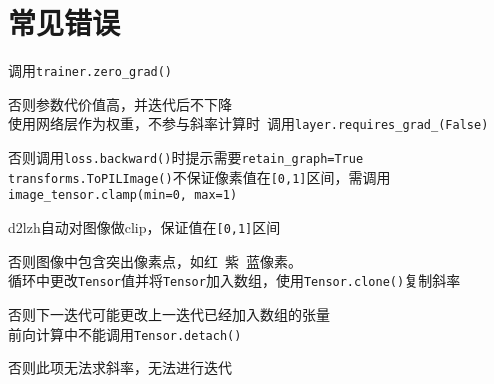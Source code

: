 \documentclass[UTF8]{ctexart}
\begin{document}
\section{常见错误}
\noindent 调用\texttt{trainer.zero\_grad()}

  否则参数代价值高，并迭代后不下降\\
使用网络层作为权重，不参与斜率计算时\ 调用\texttt{layer.requires\_grad\_(False)}

  否则调用\texttt{loss.backward()}时提示需要\texttt{retain\_graph=True}\\
\texttt{transforms.ToPILImage()}不保证像素值在\texttt{[0,1]}区间，需调用\texttt{image\_tensor.clamp(min=0, max=1)}

  d2lzh自动对图像做clip，保证值在\texttt{[0,1]}区间
  
  否则图像中包含突出像素点，如红\ 紫\ 蓝像素。\\
循环中更改\texttt{Tensor}值并将\texttt{Tensor}加入数组，使用\texttt{Tensor.clone()}复制斜率

  否则下一迭代可能更改上一迭代已经加入数组的张量\\
前向计算中不能调用\texttt{Tensor.detach()}

  否则此项无法求斜率，无法进行迭代
\end{document}
